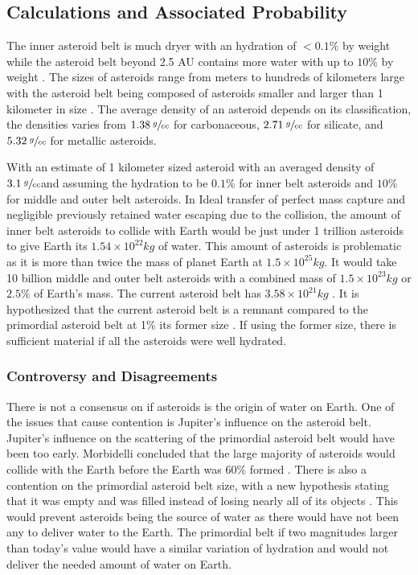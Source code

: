 \documentclass{article}
\begin{document}
\subsection{Calculations and Associated Probability}
The inner asteroid belt is much dryer with an hydration of \(<0.1\%\) by weight while the  asteroid belt beyond 2.5 AU contains more water with up to \(10\%\) by weight \cite{morbidelli2000source}. The sizes of asteroids range from meters to hundreds of kilometers large with the asteroid belt being composed of asteroids smaller and larger than 1 kilometer in size \cite{asteroid_AvgSz}. The average density of an asteroid depends on its classification, the densities varies from \(1.38 \: \sfrac{g}{cc}\) for carbonaceous, \(2.71 \: \sfrac{g}{cc}\) for silicate, and \(5.32 \: \sfrac{g}{cc}\) for metallic asteroids\cite{Asteroid_Density}. 

With an estimate of 1 kilometer sized asteroid with an averaged density of \(3.1 \: \sfrac{g}{cc}\)and assuming the hydration to be \(0.1\%\) for inner belt asteroids and \(10\%\) for middle and outer belt asteroids.
In Ideal transfer of perfect mass capture and negligible previously retained water escaping due to the collision, the amount of inner belt asteroids to collide with Earth would be just under 1 trillion asteroids to give Earth its \(1.54\times 10^{22} kg\) of water. This amount of asteroids is problematic as it is more than twice the mass of planet Earth at \(1.5\times 10^{25} kg\).
It would take 10 billion middle and outer belt asteroids with a combined mass of \(1.5\times 10^{23} kg\) or \(2.5\%\) of Earth's mass.
The current asteroid belt has \(3.58 \times 10^{21}kg\) \cite{AsteroidBeltMass}.
It is hypothesized that the current asteroid belt is a remnant compared to the primordial asteroid belt at 1\% its former size \cite{PrimAstBelt}. If using the former size, there is sufficient material if all the asteroids were well hydrated.

\subsubsection{Controversy and Disagreements}
There is not a consensus on if asteroids is the origin of water on Earth. One of the issues that cause contention is Jupiter's influence on the asteroid belt. Jupiter's influence on the scattering of the primordial asteroid belt would have been too early. Morbidelli concluded that the large majority of asteroids would collide with the Earth before the Earth was 60\% formed \cite{morbidelli2000source}. 
There is also a contention on the primordial asteroid belt size, with a new hypothesis stating that it was empty and was filled instead of losing nearly all of its objects \cite{Emptybelt}. This would prevent asteroids being the source of water as there would have not been any to deliver water to the Earth.
The primordial belt if two magnitudes larger than today's value would have a similar variation of hydration and would not deliver the needed amount of water on Earth.
\end{document}
